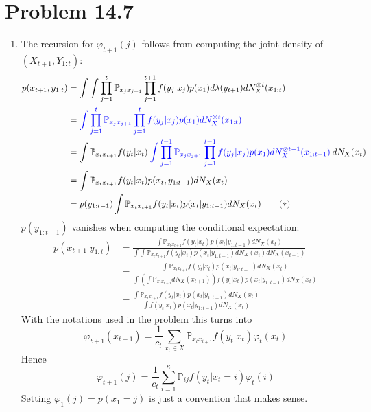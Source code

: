 \documentclass[a4paper,11pt, hidelinks]{article}
\begin{document}
\section*{Problem 14.7}
\begin{enumerate}[label=(\alph*)]
	\item The recursion for $\varphi_{t+1}(j)$ follows from computing the joint density of $(X_{t+1},Y_{1:t})$:
	$$\begin{aligned}
		p(x_{t+1},y_{1:t}) &= \int \int \prod_{j=1}^{t}\mathbb P_{x_{j} x_{j+1}} \prod_{j=1}^{t+1} f(y_j|x_j)p(x_1) d\lambda(y_{t+1})dN_X^{\otimes t}(x_{1:t})\\
		&= \mathbin{\textcolor{blue}{\int \prod_{j=1}^{t}\mathbb P_{x_{j} x_{j+1}} \prod_{j=1}^{t} f(y_j|x_j)p(x_1) dN_X^{\otimes t}(x_{1:t})}} \\
		&= \int \mathbb P_{x_{t} x_{t+1}} f(y_t|x_t) \mathbin{\textcolor{blue}{\int \prod_{j=1}^{t-1}\mathbb P_{x_{j} x_{j+1}} \prod_{j=1}^{t-1}f(y_j|x_j)p(x_1) dN_X^{\otimes t-1}(x_{1:t-1})}} dN_X(x_t)\\
		&= \int \mathbb P_{x_{t} x_{t+1}} f(y_t|x_t) p(x_{t},y_{1:t-1})  dN_X(x_t)\\
		&= p(y_{1:t-1}) \int \mathbb P_{x_{t} x_{t+1}} f(y_t|x_t) p(x_{t}|y_{1:t-1})  dN_X(x_t) \quad \quad (*)
	\end{aligned}$$
	$p(y_{1:t-1})$ vanishes when computing the conditional expectation: 
	$$\begin{aligned} p(x_{t+1}|y_{1:t}) &= \frac{\int \mathbb P_{x_{t} x_{t+1}} f(y_t|x_t) p(x_{t}|y_{1:t-1})  dN_X(x_t)}{\int \int \mathbb P_{x_{t} x_{t+1}} f(y_t|x_t) p(x_{t}|y_{1:t-1})  dN_X(x_t) dN_X(x_{t+1})}\\
	&= \frac{\int \mathbb P_{x_{t} x_{t+1}} f(y_t|x_t) p(x_{t}|y_{1:t-1})  dN_X(x_t)}{\int (\int \mathbb P_{x_{t} x_{t+1}} dN_X(x_{t+1})) f(y_t|x_t) p(x_{t}|y_{1:t-1})  dN_X(x_t) }\\
	&= \frac{\int \mathbb P_{x_{t} x_{t+1}} f(y_t|x_t) p(x_{t}|y_{1:t-1})  dN_X(x_t)}{\int f(y_t|x_t) p(x_{t}|y_{1:t-1})  dN_X(x_t) }
	\end{aligned}
	$$
	With the notations used in the problem this turns into
	$$\varphi_{t+1}(x_{t+1}) = \frac{1}{c_t} \sum_{x_t\in X} \mathbb P_{x_{t} x_{t+1}} f(y_t|x_t) \varphi_{t}(x_{t})$$
	Hence 
	$$\varphi_{t+1}(j) = \frac{1}{c_t} \sum_{i=1}^\kappa \mathbb P_{ij} f(y_t|x_t=i) \varphi_{t}(i)$$
	Setting $\varphi_{1}(j) = p(x_1=j)$ is just a convention that makes sense.


\end{enumerate}
\end{document}
